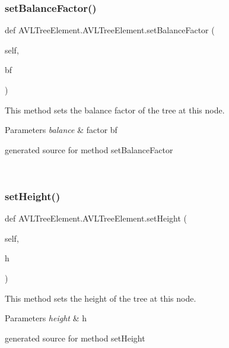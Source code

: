 \subsubsection{\texorpdfstring{set\+Balance\+Factor()}{setBalanceFactor()}}
{\footnotesize\ttfamily def A\+V\+L\+Tree\+Element.\+A\+V\+L\+Tree\+Element.\+set\+Balance\+Factor (\begin{DoxyParamCaption}\item[{}]{self,  }\item[{}]{bf }\end{DoxyParamCaption})}



This method sets the balance factor of the tree at this node. 


\begin{DoxyParams}{Parameters}
{\em balance} & factor bf\begin{DoxyVerb}generated source for method setBalanceFactor \end{DoxyVerb}
 \\
\hline
\end{DoxyParams}
\hypertarget{class_a_v_l_tree_element_1_1_a_v_l_tree_element_af068e3b5c1afb520aeff8bd75dd252ee}{}\label{class_a_v_l_tree_element_1_1_a_v_l_tree_element_af068e3b5c1afb520aeff8bd75dd252ee} 
\subsubsection{\texorpdfstring{set\+Height()}{setHeight()}}
{\footnotesize\ttfamily def A\+V\+L\+Tree\+Element.\+A\+V\+L\+Tree\+Element.\+set\+Height (\begin{DoxyParamCaption}\item[{}]{self,  }\item[{}]{h }\end{DoxyParamCaption})}



This method sets the height of the tree at this node. 


\begin{DoxyParams}{Parameters}
{\em height} & h\begin{DoxyVerb}generated source for method setHeight \end{DoxyVerb}
 \\
\hline
\end{DoxyParams}


